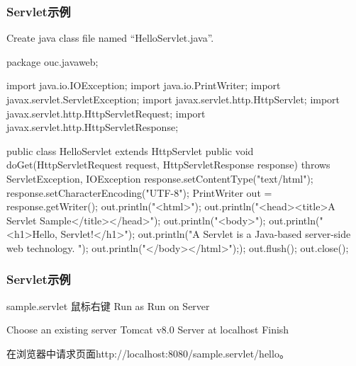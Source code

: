 \begin{frame}[fragile] %
\frametitle{Servlet示例} 


Create java class file named ``HelloServlet.java''.

\begin{javaCode}
package ouc.javaweb;

import java.io.IOException;
import java.io.PrintWriter;
import javax.servlet.ServletException;
import javax.servlet.http.HttpServlet;
import javax.servlet.http.HttpServletRequest;
import javax.servlet.http.HttpServletResponse;

public class HelloServlet extends HttpServlet {
  public void doGet(HttpServletRequest request, HttpServletResponse response)
  throws ServletException, IOException {
    response.setContentType("text/html");
    response.setCharacterEncoding("UTF-8");
    PrintWriter out = response.getWriter();
    out.println("<html>");
    out.println("<head><title>A Servlet Sample</title></head>");
    out.println("<body>");
    out.println("<h1>Hello, Servlet!</h1>");
    out.println("A Servlet is a Java-based server-side web technology. ");
    out.println("</body></html>"););
    out.flush();
    out.close();
  }
}
\end{javaCode}
\end{frame}

\begin{frame}[fragile] %
\frametitle{Servlet示例} 

sample.servlet  鼠标右键  Run as  Run on Server

  Choose an existing server  Tomcat v8.0 Server at localhost  Finish

在浏览器中请求页面{\Blue http://localhost:8080/sample.servlet/hello}。

\end{frame}


